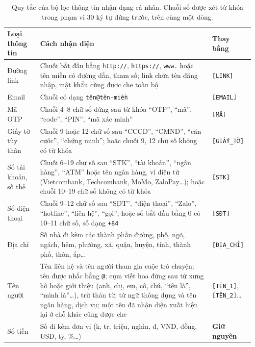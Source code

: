 \documentclass[11pt,a4paper]{article}
\renewcommand{\arraystretch}{1.2}
\newcommand{\gc}[1]{\texttt{#1}}
\begin{document}
\begin{table}[!htbp]
\centering
\footnotesize
\renewcommand{\arraystretch}{1.1}
\begin{tabularx}{\linewidth}{@{}p{2.6cm}Yp{2.2cm}@{}}
\toprule
\textbf{Loại thông tin} & \textbf{Cách nhận diện} & \textbf{Thay bằng} \\
\midrule
Đường link & Chuỗi bắt đầu bằng \texttt{http://}, \texttt{https://}, \texttt{www.} hoặc tên miền có đường dẫn, tham số;
  link chứa tên đăng nhập, mật khẩu cũng được che toàn bộ & \gc{[LINK]} \\
Email & Chuỗi có dạng \texttt{tên@tên-miền} & \gc{[EMAIL]} \\
Mã OTP & Chuỗi 4--8 chữ số đứng sau từ khóa ``OTP'', ``mã'', ``code'', ``PIN'', ``mã xác minh'' & \gc{[MÃ]} \\
Giấy tờ tùy thân & Chuỗi 9 hoặc 12 chữ số sau ``CCCD'', ``CMND'', ``căn cước'', ``chứng minh''; hoặc chuỗi 9, 12 chữ
  số không có từ khóa & \gc{[GIẤY\_TỜ]} \\
Số tài khoản, số thẻ & Chuỗi 6--19 chữ số sau ``STK'', ``tài khoản'', ``ngân hàng'', ``ATM'' hoặc tên ngân hàng, ví
  điện tử (Vietcombank, Techcombank, MoMo, ZaloPay\ldots); hoặc chuỗi 10--19 chữ số không có từ khóa & \gc{[STK]} \\
Số điện thoại & Chuỗi 9--12 chữ số sau ``SĐT'', ``điện thoại'', ``Zalo'', ``hotline'', ``liên hệ'', ``gọi'';
  hoặc số bắt đầu bằng 0 có 10--11 chữ số, số dạng \texttt{+84} & \gc{[SĐT]} \\
Địa chỉ & Số nhà đi kèm các thành phần đường, phố, ngõ, ngách, hẻm, phường, xã, quận, huyện, tỉnh, thành phố,
  thôn, ấp\ldots & \gc{[ĐỊA\_CHỈ]} \\
Tên người & Tên liên hệ và tên người tham gia cuộc trò chuyện; tên được nhắc bằng \texttt{@}; cụm viết hoa đứng
  sau từ xưng hô hoặc giới thiệu (anh, chị, em, cô, chú, ``tên là'', ``mình là''\ldots), trừ thán từ, từ ngữ
  thông dụng và tên ngân hàng, dịch vụ; một tên đã nhận diện xuất hiện lại ở chỗ khác cũng được che &
  \gc{[TÊN\_1]}, \gc{[TÊN\_2]}\ldots \\
\midrule
Số tiền & Số đi kèm đơn vị (k, tr, triệu, nghìn, đ, VND, đồng, USD, tỷ, \%\ldots) & \textbf{Giữ nguyên} \\
\bottomrule
\end{tabularx}
\caption{Quy tắc của bộ lọc thông tin nhận dạng cá nhân. Chuỗi số được xét từ khóa trong phạm vi 30 ký tự đứng
trước, trên cùng một dòng.}
\label{tab:boloc}
\end{table}
\end{document}
